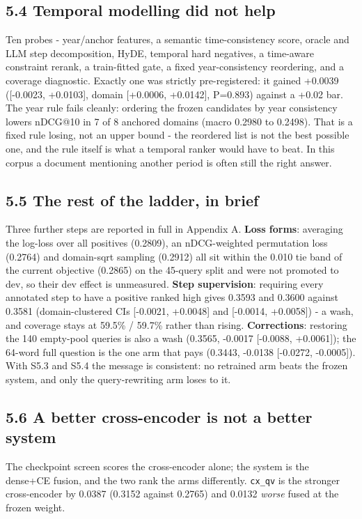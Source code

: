\documentclass[11pt]{article}
\begin{document}
\subsection*{5.4 Temporal modelling did not help}
Ten probes - year/anchor features, a semantic time-consistency score, oracle and LLM step decomposition, HyDE, temporal hard negatives, a time-aware constraint rerank, a train-fitted gate, a fixed year-consistency reordering, and a coverage diagnostic. Exactly one was strictly pre-registered: it gained +0.0039 ([-0.0023, +0.0103], domain [+0.0006, +0.0142], P=0.893) against a +0.02 bar. The year rule fails cleanly: ordering the frozen candidates by year consistency lowers nDCG@10 in 7 of 8 anchored domains (macro 0.2980 to 0.2498). That is a fixed rule losing, not an upper bound - the reordered list is not the best possible one, and the rule itself is what a temporal ranker would have to beat. In this corpus a document mentioning another period is often still the right answer.

\subsection*{5.5 The rest of the ladder, in brief}
Three further steps are reported in full in Appendix A. \textbf{Loss forms}: averaging the log-loss over all positives (0.2809), an nDCG-weighted permutation loss (0.2764) and domain-sqrt sampling (0.2912) all sit within the 0.010 tie band of the current objective (0.2865) on the 45-query split and were not promoted to dev, so their dev effect is unmeasured. \textbf{Step supervision}: requiring every annotated step to have a positive ranked high gives 0.3593 and 0.3600 against 0.3581 (domain-clustered CIs [-0.0021, +0.0048] and [-0.0014, +0.0058]) - a wash, and coverage stays at 59.5\% / 59.7\% rather than rising. \textbf{Corrections}: restoring the 140 empty-pool queries is also a wash (0.3565, -0.0017 [-0.0088, +0.0061]); the 64-word full question is the one arm that pays (0.3443, -0.0138 [-0.0272, -0.0005]). With S5.3 and S5.4 the message is consistent: no retrained arm beats the frozen system, and only the query-rewriting arm loses to it.

\subsection*{5.6 A better cross-encoder is not a better system}
The checkpoint screen scores the cross-encoder alone; the system is the dense+CE fusion, and the two rank the arms differently. \texttt{cx\_qv} is the stronger cross-encoder by 0.0387 (0.3152 against 0.2765) and 0.0132 \emph{worse} fused at the frozen weight.
\end{document}
